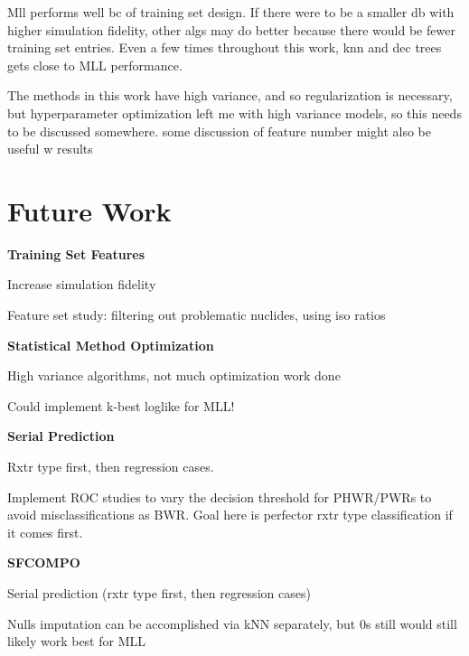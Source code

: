Mll performs well bc of training set design. If there were to be a smaller db
with higher simulation fidelity, other algs may do better because there would
be fewer training set entries. Even a few times throughout this work, knn and
dec trees gets close to MLL performance.

The methods in this work have high variance, and so regularization is necessary,
but hyperparameter optimization left me with high variance models, so this
needs to be discussed somewhere. some discussion of feature number might
also be useful w results


\section{Future Work}
\label{sec:future}

\noindent \textbf{Training Set Features}

Increase simulation fidelity

Feature set study: filtering out problematic nuclides, using iso ratios

\noindent \textbf{Statistical Method Optimization}

High variance algorithms, not much optimization work done

Could implement k-best loglike for MLL!

\noindent \textbf{Serial Prediction}

Rxtr type first, then regression cases. 

Implement ROC studies to vary the decision threshold for PHWR/PWRs to avoid
misclassifications as BWR. Goal here is perfector rxtr type classification if
it comes first. 

\noindent \textbf{\gls{SFCOMPO}}

Serial prediction (rxtr type first, then regression cases)

Nulls imputation can be accomplished via kNN separately, but 0s still would
still likely work best for MLL

